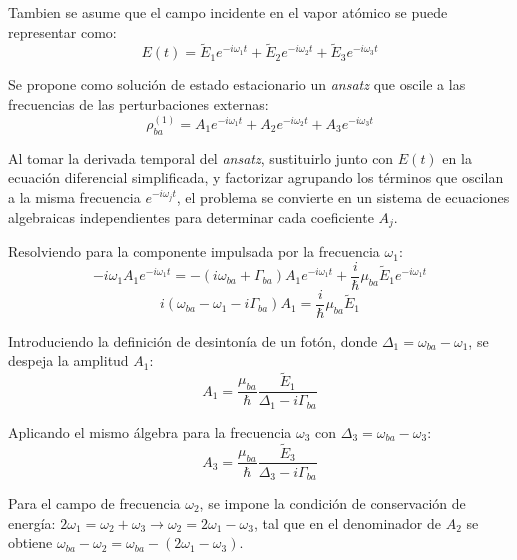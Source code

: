 \documentclass[12pt,a4paper]{article}
\begin{document}
Tambien se asume que el campo incidente en el vapor atómico se puede representar como: 
\begin{equation}
E(t) = \tilde{E}_1 e^{-i\omega_1 t} + \tilde{E}_2 e^{-i\omega_2 t} + \tilde{E}_3 e^{-i\omega_3 t}
\end{equation}

Se propone como solución de estado estacionario un \textit{ansatz} que oscile a las frecuencias de las perturbaciones externas:
\begin{equation}
\rho_{ba}^{(1)} = A_1 e^{-i\omega_1 t} + A_2 e^{-i\omega_2 t} + A_3 e^{-i\omega_3 t}
\end{equation}

Al tomar la derivada temporal del \textit{ansatz}, sustituirlo junto con $E(t)$ en la ecuación diferencial simplificada, y factorizar agrupando los términos que oscilan a la misma frecuencia $e^{-i\omega_j t}$, el problema se convierte en un sistema de ecuaciones algebraicas independientes para determinar cada coeficiente $A_j$.

Resolviendo para la componente impulsada por la frecuencia $\omega_1$:
\begin{equation}
-i\omega_1 A_1 e^{-i\omega_1 t} = -(i\omega_{ba} + \Gamma_{ba}) A_1 e^{-i\omega_1 t} + \frac{i}{\hbar}\mu_{ba}\tilde{E}_1 e^{-i\omega_1 t}
\end{equation}
\begin{equation}
i(\omega_{ba} - \omega_1 - i\Gamma_{ba})A_1 = \frac{i}{\hbar}\mu_{ba}\tilde{E}_1
\end{equation}

Introduciendo la definición de desintonía de un fotón, donde $\Delta_1 = \omega_{ba} - \omega_1$, se despeja la amplitud $A_1$:
\begin{equation}
A_1 = \frac{\mu_{ba}}{\hbar} \frac{\tilde{E}_1}{\Delta_1 - i\Gamma_{ba}}
\end{equation}

Aplicando el mismo álgebra para la frecuencia $\omega_3$ con $\Delta_3 = \omega_{ba} - \omega_3$:
\begin{equation}
A_3 = \frac{\mu_{ba}}{\hbar} \frac{\tilde{E}_3}{\Delta_3 - i\Gamma_{ba}}
\end{equation}

Para el campo de frecuencia $\omega_2$, se impone la condición de conservación de energía: $2\omega_1 = \omega_2 + \omega_3 \xrightarrow{} \omega_2 = 2\omega_1 - \omega_3$, tal que en el denominador de $A_2$ se obtiene $\omega_{ba} - \omega_2 = \omega_{ba} - (2\omega_1 - \omega_3)$. 
\end{document}

